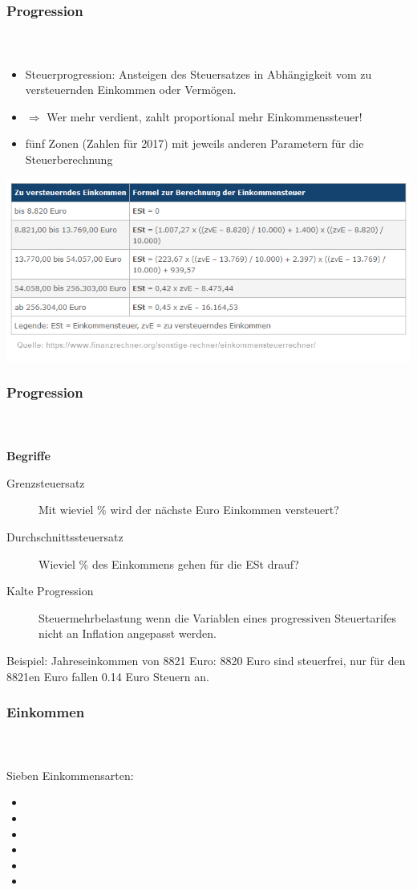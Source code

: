 \documentclass[ngerman]{beamer}
\begin{document}
\begin{frame}
\frametitle{Progression}
\framesubtitle{~}

\begin{itemize}
\item Steuerprogression: Ansteigen des Steuersatzes in Abhängigkeit vom zu versteuernden Einkommen oder Vermögen. 
\item $\Rightarrow$ Wer mehr verdient, zahlt proportional mehr Einkommenssteuer!
\item fünf Zonen (Zahlen für 2017) mit jeweils anderen Parametern für die Steuerberechnung
\end{itemize}


\includegraphics[width=\textwidth]{Bilder/Formeln}

\end{frame}

\begin{frame}
\frametitle{Progression}
\framesubtitle{~}

\textbf{Begriffe}

\begin{description}
\item[Grenzsteuersatz] Mit wieviel \% wird der nächste Euro Einkommen versteuert?
\item[Durchschnittssteuersatz] Wieviel \% des Einkommens gehen für die ESt drauf?
\item[Kalte Progression] Steuermehrbelastung wenn die Variablen eines progressiven Steuertarifes nicht an Inflation angepasst werden.
\end{description}

Beispiel: Jahreseinkommen von 8821 Euro: 8820 Euro sind steuerfrei, nur für den 8821en Euro fallen 0.14 Euro Steuern an.



\end{frame}

\begin{frame}
\frametitle{Einkommen}
\framesubtitle{~}

Sieben Einkommensarten:

\begin{itemize}
\item 
\item 
\item 
\item 
\item 
\item 
\end{itemize}
\end{frame}
\end{document}
